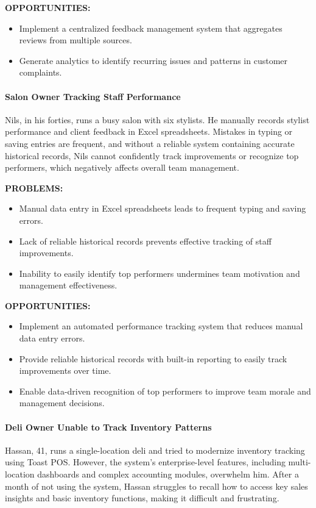 \documentclass[]{VUMIFTemplateClass}
\newcommand{\subsubsubsection}[1]{\paragraph{#1}}
\begin{document}
\textbf{OPPORTUNITIES:}
\begin{itemize}
    \item Implement a centralized feedback management system that aggregates reviews from multiple sources.
    \item Generate analytics to identify recurring issues and patterns in customer complaints.
\end{itemize}

\subsubsubsection{Salon Owner Tracking Staff Performance}
\label{subsubsubsec:owner-staff-performance}

Nils, in his forties, runs a busy salon with six stylists. He manually records
stylist performance and client feedback in Excel spreadsheets. Mistakes in
typing or saving entries are frequent, and without a reliable system containing
accurate historical records, Nils cannot confidently track improvements or recognize top performers, which negatively affects overall team management.

\textbf{PROBLEMS:}
\begin{itemize}
    \item Manual data entry in Excel spreadsheets leads to frequent typing and saving errors.
    \item Lack of reliable historical records prevents effective tracking of staff improvements.
    \item Inability to easily identify top performers undermines team motivation and management effectiveness.
\end{itemize}

\newpage
\textbf{OPPORTUNITIES:}
\begin{itemize}
    \item Implement an automated performance tracking system that reduces manual data entry errors.
    \item Provide reliable historical records with built-in reporting to easily track improvements over time.
    \item Enable data-driven recognition of top performers to improve team morale and management decisions.
\end{itemize}

\subsubsubsection{Deli Owner Unable to Track Inventory Patterns}
\label{subsubsubsec:deli-inventory}

Hassan, 41, runs a single-location deli and tried to modernize inventory tracking using Toast POS. However, the system’s enterprise-level features, including multi-location dashboards and complex accounting modules, overwhelm him. After a month of not using the system, Hassan struggles to recall how to access key sales insights and basic inventory functions, making it difficult and frustrating.
\end{document}
